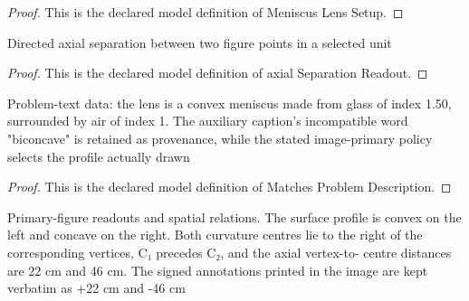 \begin{proof}
  This is the declared model definition of Meniscus Lens Setup.
\end{proof}
\begin{definition}
  \label{def:physics:phyx-mini-0133:phyxminiproblems-problemphyxmini0133-axialseparationreadout}
  Directed axial separation between two figure points in a selected unit
\end{definition}
\begin{proof}
  This is the declared model definition of axial Separation Readout.
\end{proof}
\begin{definition}
  \label{def:physics:phyx-mini-0133:phyxminiproblems-problemphyxmini0133-matchesproblemdescription}
  Problem-text data: the lens is a convex meniscus made from glass of index 1.50, surrounded by air of index 1. The auxiliary caption's incompatible word "biconcave" is retained as provenance, while the stated image-primary policy selects the profile actually drawn
\end{definition}
\begin{proof}
  This is the declared model definition of Matches Problem Description.
\end{proof}
\begin{definition}
  \label{def:physics:phyx-mini-0133:phyxminiproblems-problemphyxmini0133-matchesprimaryfigure}
  Primary-figure readouts and spatial relations. The surface profile is convex on the left and concave on the right. Both curvature centres lie to the right of the corresponding vertices, C₁ precedes C₂, and the axial vertex-to- centre distances are 22 cm and 46 cm. The signed annotations printed in the image are kept verbatim as +22 cm and -46 cm
\end{definition}
